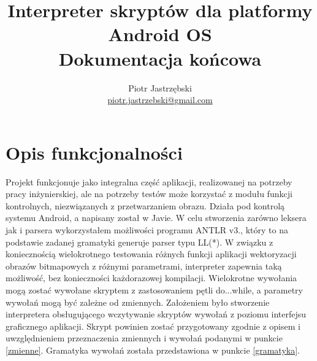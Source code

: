 \documentclass[11pt,a4paper]{article}
\title{Interpreter skryptów dla platformy Android OS\\ \large Dokumentacja końcowa}
\author{Piotr Jastrzębski\\ \url{piotr.jastrzebski@gmail.com}}
\date{}
\begin{document}
\maketitle

\section{Opis funkcjonalności}
Projekt funkcjonuje jako integralna część aplikacji, realizowanej na potrzeby pracy inżynierskiej, ale na potrzeby testów może korzystać z modułu funkcji kontrolnych, niezwiązanych z przetwarzaniem obrazu. Działa pod kontrolą systemu Android, a napisany został w Javie. W celu stworzenia zarówno leksera jak i parsera wykorzystałem możliwości programu ANTLR v3., który to na podstawie zadanej gramatyki generuje parser typu LL(*). W związku z koniecznością wielokrotnego testowania różnych funkcji aplikacji wektoryzacji obrazów bitmapowych z różnymi parametrami, interpreter zapewnia taką możliwość, bez konieczności każdorazowej kompilacji. Wielokrotne wywołania mogą zostać wywołane skryptem z zastosowaniem pętli do...while, a parametry wywołań mogą być zależne od zmiennych. Założeniem było stworzenie interpretera obsługującego wczytywanie skryptów wywołań z poziomu interfejsu graficznego aplikacji. Skrypt powinien zostać przygotowany zgodnie z opisem i uwzględnieniem przeznaczenia zmiennych i wywołań podanymi w punkcie \ref{zmienne}. Gramatyka wywołań została przedstawiona w punkcie \ref{gramatyka}.
\end{document}
